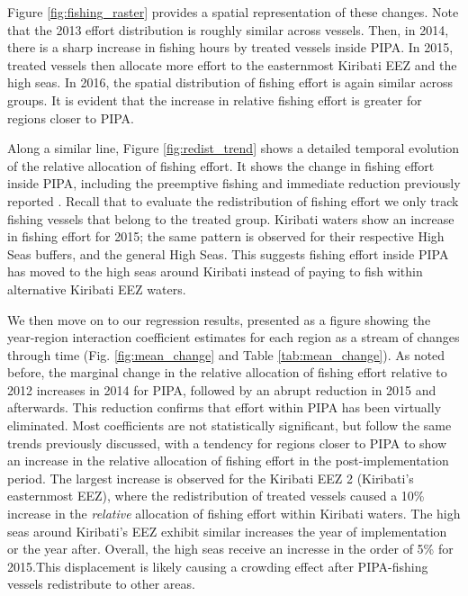 \documentclass[9pttwoside,lineno]{pnas-new}
\begin{document}

Figure \ref{fig:fishing_raster} provides a spatial representation of
these changes. Note that the 2013 effort distribution is roughly similar
across vessels. Then, in 2014, there is a sharp increase in fishing hours
by treated vessels inside PIPA. In 2015, treated vessels
then allocate more effort to the easternmost Kiribati EEZ and the high seas.
In 2016, the spatial distribution of
fishing effort is again similar across groups. It is evident that the
increase in relative fishing effort is greater for regions closer to
PIPA. 

Along a similar line, Figure \ref{fig:redist_trend} shows a detailed
temporal evolution of the relative allocation of fishing
effort.  It shows the change in fishing effort inside PIPA, including the
preemptive fishing and immediate reduction previously reported
\citep{mcdermott_2018}. Recall that to evaluate the redistribution of fishing effort
we only track fishing vessels that belong to the treated group.
Kiribati waters show an increase in fishing effort for 2015;
the same pattern is observed for their respective High Seas buffers,
and the general High Seas. This suggests fishing effort inside PIPA has moved to the
high seas around Kiribati instead of paying to fish within alternative Kiribati EEZ waters.

We then move on to our regression results, presented as a figure showing
the year-region interaction coefficient estimates for each region as a
stream of changes through time (Fig. \ref{fig:mean_change} and Table
\ref{tab:mean_change}). As noted before, the marginal change in the
relative allocation of fishing effort relative to 2012 increases in 2014
for PIPA, followed by an abrupt reduction in 2015 and afterwards. This 
reduction confirms that effort within PIPA has been virtually eliminated.
Most coefficients are not statistically significant, but
follow the same trends previously discussed, with a tendency for regions
closer to PIPA to show an increase in the relative allocation of fishing
effort in the post-implementation period. The largest increase is
observed for the Kiribati EEZ 2 (Kiribati's easternmost EEZ), where the
redistribution of treated vessels caused a 10\% increase in the \emph{relative} allocation of
fishing effort within Kiribati waters. The high seas around Kiribati's EEZ exhibit
similar increases the year of implementation or the year after. Overall, the high seas
receive an incresse in the order of 5\% for 2015.This displacement is likely
causing a crowding effect after PIPA-fishing vessels redistribute to
other areas.
\end{document}
